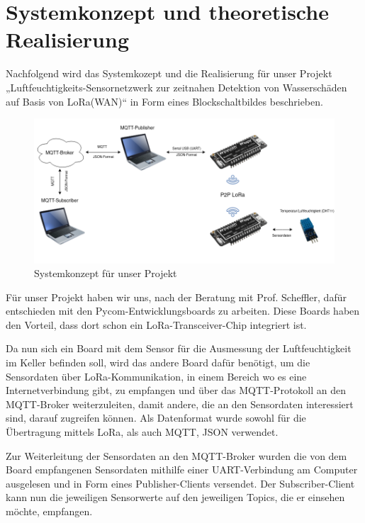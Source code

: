 \newpage


\section{Systemkonzept und theoretische Realisierung} \label{Systemkonzept und theoretische Realisierung}

Nachfolgend wird das Systemkozept und die Realisierung für unser Projekt „Luftfeuchtigkeits-Sensornetzwerk zur zeitnahen Detektion von Wasserschäden auf Basis von LoRa(WAN)“ in Form eines Blockschaltbildes beschrieben. 

\begin{figure}[h]
 \centering
 \includegraphics[width=1\textwidth]{pictures/Blockschaltbild_ProNeSy}
 \caption[Systemkonzept für unser Projekt]{Systemkonzept für unser Projekt}
 \label{fig:systemkonzept}
\end{figure}

Für unser Projekt haben wir uns, nach der Beratung mit Prof. Scheffler, dafür entschieden mit den Pycom-Entwicklungsboards zu arbeiten. Diese Boards haben den Vorteil, dass dort schon ein LoRa-Transceiver-Chip integriert ist. 

Da nun sich ein Board mit dem Sensor für die Ausmessung der Luftfeuchtigkeit im Keller befinden soll, wird das andere Board dafür benötigt, um die Sensordaten über LoRa-Kommunikation, in einem Bereich wo es eine Internetverbindung gibt, zu empfangen und über das MQTT-Protokoll an den MQTT-Broker weiterzuleiten, damit andere, die an den Sensordaten interessiert sind, darauf zugreifen können. Als Datenformat wurde sowohl für die Übertragung mittels LoRa, als auch MQTT, JSON verwendet.

Zur Weiterleitung der Sensordaten an den MQTT-Broker wurden die von dem Board empfangenen Sensordaten mithilfe einer UART-Verbindung am Computer ausgelesen und in Form eines Publisher-Clients versendet. Der Subscriber-Client kann nun die jeweiligen Sensorwerte auf den jeweiligen Topics, die er einsehen möchte, empfangen.

